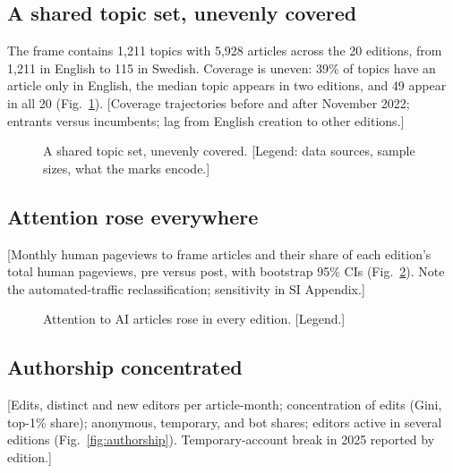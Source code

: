\documentclass[9pt,twocolumn,twoside]{pnas-new}
\begin{document}
\subsection*{A shared topic set, unevenly covered}
The frame contains 1,211 topics with 5,928 articles across the 20 editions, from 1,211 in English to 115 in Swedish. Coverage is uneven: 39\% of topics have an article only in English, the median topic appears in two editions, and 49 appear in all 20 (Fig.~\ref{fig:coverage}). [Coverage trajectories before and after November 2022; entrants versus incumbents; lag from English creation to other editions.]

\begin{figure}[t]
\centering
{}
\caption{A shared topic set, unevenly covered. [Legend: data sources, sample sizes, what the marks encode.]}
\label{fig:coverage}
\end{figure}

\subsection*{Attention rose everywhere}
[Monthly human pageviews to frame articles and their share of each edition's total human pageviews, pre versus post, with bootstrap 95\% CIs (Fig.~\ref{fig:attention}). Note the automated-traffic reclassification; sensitivity in SI Appendix.]

\begin{figure}[t]
\centering
{}
\caption{Attention to AI articles rose in every edition. [Legend.]}
\label{fig:attention}
\end{figure}

\subsection*{Authorship concentrated}
[Edits, distinct and new editors per article-month; concentration of edits (Gini, top-1\% share); anonymous, temporary, and bot shares; editors active in several editions (Fig.~\ref{fig:authorship}). Temporary-account break in 2025 reported by edition.]
\end{document}
